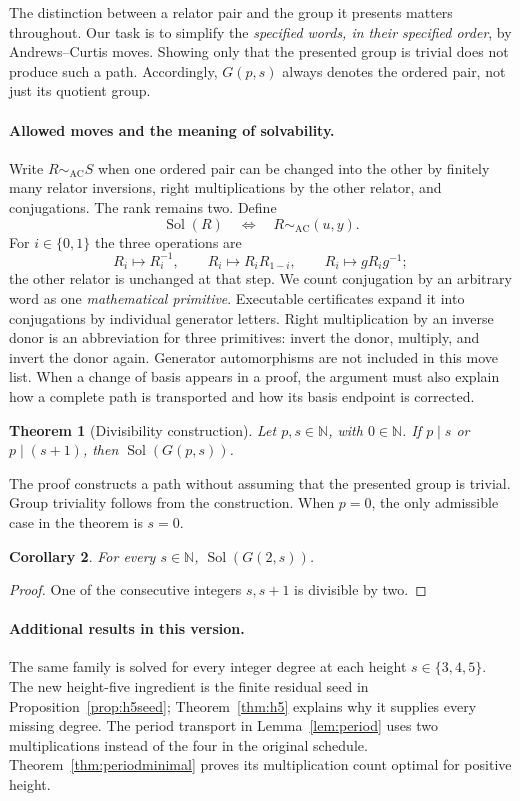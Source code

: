 \documentclass[11pt]{article}
\newtheorem{theorem}{Theorem}[section]
\newtheorem{corollary}[theorem]{Corollary}
\theoremstyle{definition}\newtheorem{definition}[theorem]{Definition}
\theoremstyle{remark}\newtheorem{remark}[theorem]{Remark}
\newcommand{\Sol}{\operatorname{Sol}}
\newcommand{\AC}{\mathrel{\sim_{\mathrm{AC}}}}
\begin{document}
The distinction between a relator pair and the group it presents matters throughout. Our task is to simplify the \emph{specified words, in their specified order}, by Andrews--Curtis moves. Showing only that the presented group is trivial does not produce such a path. Accordingly, $G(p,s)$ always denotes the ordered pair, not just its quotient group.

\paragraph{Allowed moves and the meaning of solvability.}
Write $R\AC S$ when one ordered pair can be changed into the other by finitely many relator inversions, right multiplications by the other relator, and conjugations. The rank remains two. Define
\[
\Sol(R)\quad\Longleftrightarrow\quad R\AC(u,y).
\]
For $i\in\{0,1\}$ the three operations are
\[
R_i\mapsto R_i^{-1},\qquad R_i\mapsto R_iR_{1-i},\qquad
R_i\mapsto gR_i g^{-1};
\]
the other relator is unchanged at that step. We count conjugation by an arbitrary word as one \emph{mathematical primitive}. Executable certificates expand it into conjugations by individual generator letters. Right multiplication by an inverse donor is an abbreviation for three primitives: invert the donor, multiply, and invert the donor again. Generator automorphisms are not included in this move list. When a change of basis appears in a proof, the argument must also explain how a complete path is transported and how its basis endpoint is corrected.

\begin{theorem}[Divisibility construction]\label{thm:main}
Let $p,s\in\mathbb N$, with $0\in\mathbb N$. If $p\mid s$ or $p\mid(s+1)$, then $\Sol(G(p,s))$.
\end{theorem}
The proof constructs a path without assuming that the presented group is trivial. Group triviality follows from the construction. When $p=0$, the only admissible case in the theorem is $s=0$.

\begin{corollary}\label{cor:p2}
For every $s\in\mathbb N$, $\Sol(G(2,s))$.
\end{corollary}
\begin{proof}
One of the consecutive integers $s,s+1$ is divisible by two.
\end{proof}

\paragraph{Additional results in this version.}
The same family is solved for every integer degree at each height $s\in\{3,4,5\}$. The new height-five ingredient is the finite residual seed in Proposition~\ref{prop:h5seed}; Theorem~\ref{thm:h5} explains why it supplies every missing degree. The period transport in Lemma~\ref{lem:period} uses two multiplications instead of the four in the original schedule. Theorem~\ref{thm:periodminimal} proves its multiplication count optimal for positive height.
\end{document}
